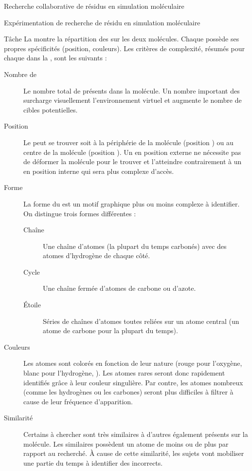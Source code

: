 \documentclass[myfrancais]{mythesis}
\begin{document}
\begin{mychapter}{Recherche collaborative de résidus en simulation moléculaire}
\begin{mysection}{Expérimentation de recherche de résidu en simulation moléculaire}
\begin{mysubsection}{Tâche}
				La  montre la répartition des  sur les deux molécules.
				Chaque  possède ses propres spécificités (position, couleurs\myetc).
				Les critères de complexité, résumés pour chaque  dans la , sont les suivants :
				\begin{description}
					\item[Nombre de ] Le nombre total de  présents dans la molécule.
						Un nombre important des  surcharge visuellement l'environnement virtuel et augmente le nombre de cibles potentielles.
					\item[Position] Le  peut se trouver soit à la périphérie de la molécule (position ) ou au centre de la molécule (position ).
						Un  en position externe ne nécessite pas de déformer la molécule pour le trouver et l'atteindre contrairement à un  en position interne qui sera plus complexe d'accès.
					\item[Forme] La forme du  est un motif graphique plus ou moins complexe à identifier.
						On distingue trois formes différentes :
						\begin{description}
							\item[Chaîne] Une chaîne d'atomes (la plupart du temps carbonés) avec des atomes d'hydrogène de chaque côté.
							\item[Cycle] Une chaîne fermée d'atomes de carbone ou d'azote.
							\item[Étoile] Séries de chaînes d'atomes toutes reliées sur un atome central (un atome de carbone pour la plupart du temps).
						\end{description}
					\item[Couleurs] Les atomes sont colorés en fonction de leur nature (rouge pour l'oxygène, blanc pour l'hydrogène, \myetc).
						Les atomes rares seront donc rapidement identifiés grâce à leur couleur singulière.
						Par contre, les atomes nombreux (comme les hydrogènes ou les carbones) seront plus difficiles à filtrer à cause de leur fréquence d'apparition.
					\item[Similarité] Certains  à chercher sont très similaires à d'autres  également présents sur la molécule.
						Les  similaires possèdent un atome de moins ou de plus par rapport au  recherché.
						À cause de cette similarité, les sujets vont mobiliser une partie du temps à identifier des  incorrects.
				\end{description}


\end{mysubsection}
\end{mysection}
\end{mychapter}
\end{document}
